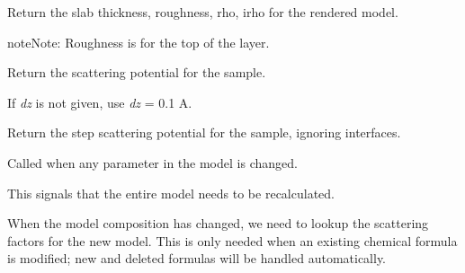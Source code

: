 \documentclass[letterpaper,10pt,english]{sphinxmanual}
\begin{document}
\begin{fulllineitems}
\begin{fulllineitems}
\label{api/experiment:refl1d.experiment.Experiment.slabs}
Return the slab thickness, roughness, rho, irho for the
rendered model.

\begin{notice}{note}{Note:}
Roughness is for the top of the layer.
\end{notice}

\end{fulllineitems}


\begin{fulllineitems}
\label{api/experiment:refl1d.experiment.Experiment.smooth_profile}
Return the scattering potential for the sample.

If \emph{dz} is not given, use \emph{dz} = 0.1 A.

\end{fulllineitems}


\begin{fulllineitems}
\label{api/experiment:refl1d.experiment.Experiment.step_profile}
Return the step scattering potential for the sample, ignoring
interfaces.

\end{fulllineitems}


\begin{fulllineitems}
\label{api/experiment:refl1d.experiment.Experiment.update}
Called when any parameter in the model is changed.

This signals that the entire model needs to be recalculated.

\end{fulllineitems}


\begin{fulllineitems}
\label{api/experiment:refl1d.experiment.Experiment.update_composition}
When the model composition has changed, we need to lookup the
scattering factors for the new model.  This is only needed
when an existing chemical formula is modified; new and
deleted formulas will be handled automatically.


\end{fulllineitems}
\end{fulllineitems}
\end{document}
